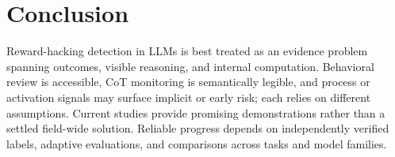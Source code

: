 \documentclass[sigconf,nonacm]{acmart}
\begin{document}
\section{Conclusion}
Reward-hacking detection in LLMs is best treated as an evidence problem spanning outcomes, visible reasoning, and internal computation. Behavioral review is accessible, CoT monitoring is semantically legible, and process or activation signals may surface implicit or early risk; each relies on different assumptions. Current studies provide promising demonstrations rather than a settled field-wide solution. Reliable progress depends on independently verified labels, adaptive evaluations, and comparisons across tasks and model families.



\end{document}
